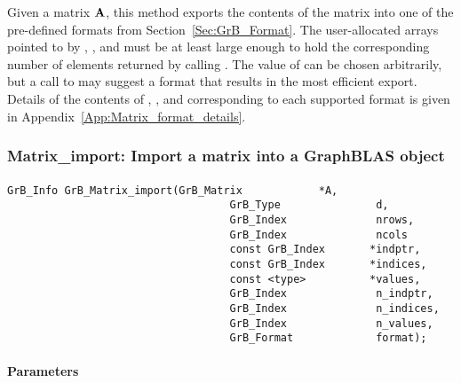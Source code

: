 Given a matrix ${\bf A}$, this method exports the contents of the matrix into 
one of the pre-defined  formats from Section~\ref{Sec:GrB_Format}.
The user-allocated arrays pointed to by , , and  must be at least
large enough to hold the corresponding number of elements returned by calling
.  The value of  can be chosen arbitrarily,
but a call to  may suggest a format that results in the
most efficient export.  Details of the contents of , , 
and  corresponding to each supported format is given in 
Appendix~\ref{App:Matrix_format_details}.


\subsubsection{{\sf Matrix\_import}: Import a matrix into a GraphBLAS object }
\label{Sec:Matrix_import}

\paragraph{\syntax}

\begin{Verbatim}[samepage=true]    
        GrB_Info GrB_Matrix_import(GrB_Matrix            *A,
                                   GrB_Type               d,
                                   GrB_Index              nrows,
                                   GrB_Index              ncols
                                   const GrB_Index       *indptr,
                                   const GrB_Index       *indices,
                                   const <type>          *values,
                                   GrB_Index              n_indptr,
                                   GrB_Index              n_indices,
                                   GrB_Index              n_values,
                                   GrB_Format             format);
\end{Verbatim}

\paragraph{Parameters}

